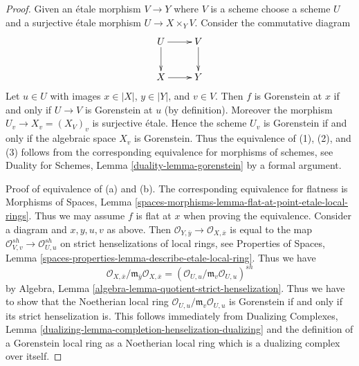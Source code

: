 \documentclass[10pt,a4paper]{amsart}
\theoremstyle{plain}
\theoremstyle{definition}
\theoremstyle{remark}
\numberwithin{equation}{subsection}
\begin{document}
\begin{proof}
Given an \'etale morphism $V \to Y$ where $V$ is a scheme
choose a scheme $U$ and a surjective \'etale morphism $U \to X \times_Y V$.
Consider the commutative diagram
$$
\xymatrix{
U \ar[d] \ar[r] & V \ar[d] \\
X \ar[r] & Y
}
$$
Let $u \in U$ with images $x \in |X|$, $y \in |Y|$, and $v \in V$.
Then $f$ is Gorenstein at $x$ if and only if $U \to V$ is
Gorenstein at $u$ (by definition). Moreover the morphism
$U_v \to X_v = (X_V)_v$ is surjective \'etale. Hence the scheme $U_v$ is
Gorenstein if and only if the algebraic space $X_v$ is Gorenstein.
Thus the equivalence of (1), (2), and (3) follows from the
corresponding equivalence for morphisms of
schemes, see Duality for Schemes, Lemma \ref{duality-lemma-gorenstein}
by a formal argument.

\medskip\noindent
Proof of equivalence of (a) and (b). The corresponding equivalence
for flatness is Morphisms of Spaces, Lemma
\ref{spaces-morphisms-lemma-flat-at-point-etale-local-rings}.
Thus we may assume $f$ is flat at $x$ when proving the equivalence.
Consider a diagram and $x, y, u, v$ as above. Then
$\mathcal{O}_{Y, \overline{y}} \to \mathcal{O}_{X, \overline{x}}$
is equal to the map
$\mathcal{O}_{V, v}^{sh} \to \mathcal{O}_{U, u}^{sh}$
on strict henselizations of local rings, see
Properties of Spaces, Lemma
\ref{spaces-properties-lemma-describe-etale-local-ring}.
Thus we have
$$
\mathcal{O}_{X, \overline{x}}/
\mathfrak m_{\overline{y}}\mathcal{O}_{X, \overline{x}} =
(\mathcal{O}_{U, u}/\mathfrak m_v \mathcal{O}_{U, u})^{sh}
$$
by Algebra, Lemma \ref{algebra-lemma-quotient-strict-henselization}.
Thus we have to show that the Noetherian local ring
$\mathcal{O}_{U, u}/\mathfrak m_v \mathcal{O}_{U, u}$
is Gorenstein if and only if its strict henselization is.
This follows immediately from
Dualizing Complexes, Lemma
\ref{dualizing-lemma-completion-henselization-dualizing}
and the definition of a Gorenstein local ring as a
Noetherian local ring which is a dualizing complex over itself.
\end{proof}
\end{document}
